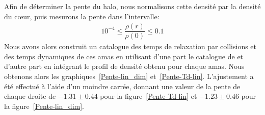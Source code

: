 

				Afin de déterminer la pente du halo, nous
				normalisons cette densité par la densité du cœur, puis mesurons la
				pente dans l'intervalle: %
				\begin{align*}
					10^{-4} \leq \dfrac{\rho(r)}{\rho(0)} \leq 0.1
				\end{align*}
				Nous avons alors construit un catalogue des temps de relaxation par
				collisions et des temps dynamiques de ces amas en utilisant d'une part le catalogue de
				\cite{Harris} et d'autre part en intégrant le profil de densité obtenu
				pour chaque amas.
				Nous obtenons alors les graphiques~\ref{Pente-lin_dim} et~\ref{Pente-Td-lin}. L'ajustement a été effectué à l'aide
				d'un moindre carrée, donnant une valeur de la pente de chaque droite de $-1.31\pm0.44$ pour la
				figure~\ref{Pente-Td-lin} et $-1.23\pm0.46$ pour la figure~\ref{Pente-lin_dim}.

